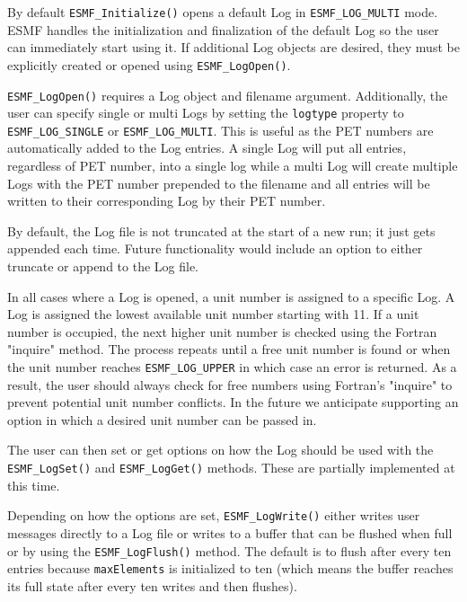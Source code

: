 

By default {\tt ESMF\_Initialize()} opens a default Log in 
{\tt ESMF\_LOG\_MULTI} mode. ESMF handles the initialization and finalization
of the default Log so the user can immediately start using it. If additional Log
objects are desired, they must be explicitly created or opened using
{\tt ESMF\_LogOpen()}.

{\tt ESMF\_LogOpen()} requires a Log object and filename argument. Additionally,
the user can specify single or multi Logs by setting the {\tt logtype} property
to {\tt ESMF\_LOG\_SINGLE} or {\tt ESMF\_LOG\_MULTI}.
This is useful as the PET numbers are automatically added to the Log entries.
A single Log will put all entries, regardless of PET number, into a single
log while a multi Log will create multiple Logs with the PET number prepended
to the filename and all entries will be written to their corresponding Log 
by their PET number.
 
By default, the Log file is not truncated at the start of a new run; it just
gets appended each time.  Future functionality would include an option to
either truncate or append to the Log file. 

In all cases where a Log is opened, a unit number is assigned to a specific
Log.  A Log is assigned the lowest available unit number starting with
11.  If a unit number is occupied, the next higher unit number is 
checked using the Fortran "inquire" method.  The process repeats until a free
unit number is found or when the unit number reaches {\tt ESMF\_LOG\_UPPER} in 
which case an error is returned.  As a result, the user should always check 
for free numbers using Fortran's "inquire" to prevent potential unit number 
conflicts.  In the future we anticipate supporting an option in which a 
desired unit number can be passed in.

The user can then set or get options on how the Log should be used 
with the {\tt ESMF\_LogSet()} and {\tt ESMF\_LogGet()} methods.  These are 
partially implemented at this time. 

Depending on how the options are set, {\tt ESMF\_LogWrite()} either writes user
messages directly to a Log file or writes to a buffer that can be flushed when 
full or by using the {\tt ESMF\_LogFlush()} method.  The default is to flush 
after every ten entries because {\tt maxElements} is initialized to ten 
(which means the buffer reaches its full state after every ten writes and then
flushes).

